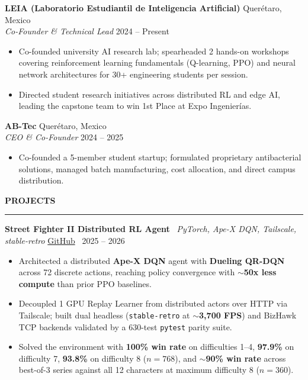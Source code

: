 \documentclass[10pt,letterpaper]{article}
\newcommand{\cvsection}[1]{%
  \vspace{3.5pt}%
  {\small\textbf{\MakeUppercase{#1}}}\\[-3.5pt]%
  \rule{\textwidth}{0.4pt}\par\vspace{2pt}%
}
\begin{document}
\vspace{2pt}
\textbf{LEIA (Laboratorio Estudiantil de Inteligencia Artificial)} \hfill Querétaro, Mexico\\
\textit{Co-Founder \& Technical Lead} \hfill 2024 – Present
\begin{itemize}
    \item Co-founded university AI research lab; spearheaded 2 hands-on workshops covering reinforcement learning fundamentals (Q-learning, PPO) and neural network architectures for 30+ engineering students per session.
    \item Directed student research initiatives across distributed RL and edge AI, leading the capstone team to win 1st Place at Expo Ingenierías.
\end{itemize}

\vspace{2pt}
\textbf{AB-Tec} \hfill Querétaro, Mexico\\
\textit{CEO \& Co-Founder} \hfill 2024 – 2025
\begin{itemize}
    \item Co-founded a 5-member student startup; formulated proprietary antibacterial solutions, managed batch manufacturing, cost allocation, and direct campus distribution.
\end{itemize}

\cvsection{Projects}

\textbf{Street Fighter II Distributed RL Agent} \textbar\ \textit{PyTorch, Ape-X DQN, Tailscale, stable-retro} \hfill \href{https://github.com/LEIA-qro/street_fighter}{\small GitHub} \textbullet\ 2025 – 2026
\begin{itemize}
    \item Architected a distributed \textbf{Ape-X DQN} agent with \textbf{Dueling QR-DQN} across 72 discrete actions, reaching policy convergence with \textbf{$\sim$50x less compute} than prior PPO baselines.
    \item Decoupled 1 GPU Replay Learner from distributed actors over HTTP via Tailscale; built dual headless (\texttt{stable-retro} at \textbf{$\sim$3,700 FPS}) and BizHawk TCP backends validated by a 630-test \texttt{pytest} parity suite.
    \item Solved the environment with \textbf{100\% win rate} on difficulties 1–4, \textbf{97.9\%} on difficulty 7, \textbf{93.8\%} on difficulty 8 ($n=768$), and \textbf{$\sim$90\% win rate} across best-of-3 series against all 12 characters at maximum difficulty 8 ($n=360$).
\end{itemize}
\end{document}
